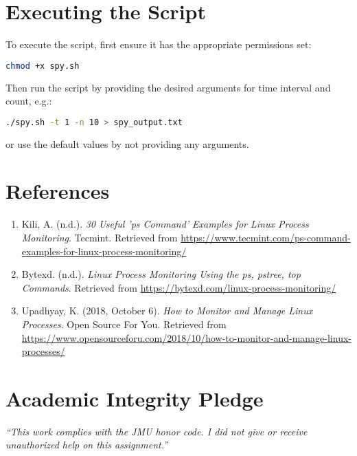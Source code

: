 \documentclass{article}
\begin{document}
\section{Executing the Script}
To execute the script, first ensure it has the appropriate permissions set:
\begin{lstlisting}[language=bash]
chmod +x spy.sh
\end{lstlisting}
Then run the script by providing the desired arguments for time interval and count, e.g.:
\begin{lstlisting}[language=bash]
./spy.sh -t 1 -n 10 > spy_output.txt
\end{lstlisting}
 or use the default values by not providing any arguments.
 
 \section*{References}
\begin{enumerate}
    \item Kili, A. (n.d.). \textit{30 Useful 'ps Command' Examples for Linux Process Monitoring}. Tecmint. Retrieved from \url{https://www.tecmint.com/ps-command-examples-for-linux-process-monitoring/}
    \item Bytexd. (n.d.). \textit{Linux Process Monitoring Using the ps, pstree, top Commands}. Retrieved from \url{https://bytexd.com/linux-process-monitoring/}
    \item Upadhyay, K. (2018, October 6). \textit{How to Monitor and Manage Linux Processes}. Open Source For You. Retrieved from \url{https://www.opensourceforu.com/2018/10/how-to-monitor-and-manage-linux-processes/}
\end{enumerate}

 \vfill
  \section*{Academic Integrity Pledge}
    {\color{red}\textit{“This work complies with the JMU honor code. I did not give or receive unauthorized help on this assignment.”}}
\end{document}
